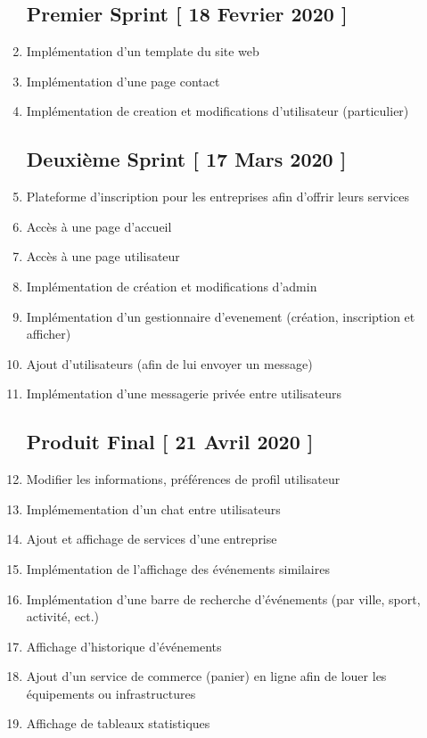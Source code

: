 \documentclass[letter,12pt]{exam}
\begin{document}
\begin{enumerate}

\subsection{Premier Sprint {[} 18 Fevrier 2020
{]}}\label{premier-sprint-18-fevrier-2020}


\tightlist
\item
  Implémentation d'un template du site web
\item
  Implémentation d'une page contact
\item
  Implémentation de creation et modifications d'utilisateur
  (particulier)

\subsection{Deuxième Sprint {[} 17 Mars 2020
{]}}\label{deuxieme-sprint-17-mars-2020}

\item
  Plateforme d'inscription pour les entreprises afin d'offrir leurs
  services
\item
  Accès à une page d'accueil
\item
  Accès à une page utilisateur
\item
  Implémentation de création et modifications d'admin
\item
  Implémentation d'un gestionnaire d'evenement (création, inscription et
  afficher)
\item
  Ajout d'utilisateurs (afin de lui envoyer un message)
\item
  Implémentation d'une messagerie privée entre utilisateurs


\subsection{Produit Final {[} 21 Avril 2020
{]}}\label{produit-final-21-avril-2020}


\item
  Modifier les informations, préférences de profil utilisateur
\item
  Implémementation d'un chat entre utilisateurs
\item
  Ajout et affichage de services d'une entreprise
\item
  Implémentation de l'affichage des événements similaires
\item
  Implémentation d'une barre de recherche d'événements (par ville,
  sport, activité, ect.)
\item
  Affichage d'historique d'événements
\item
  Ajout d'un service de commerce (panier) en ligne afin de louer les équipements ou infrastructures
\item
  Affichage de tableaux statistiques
\end{enumerate}
\end{document}
